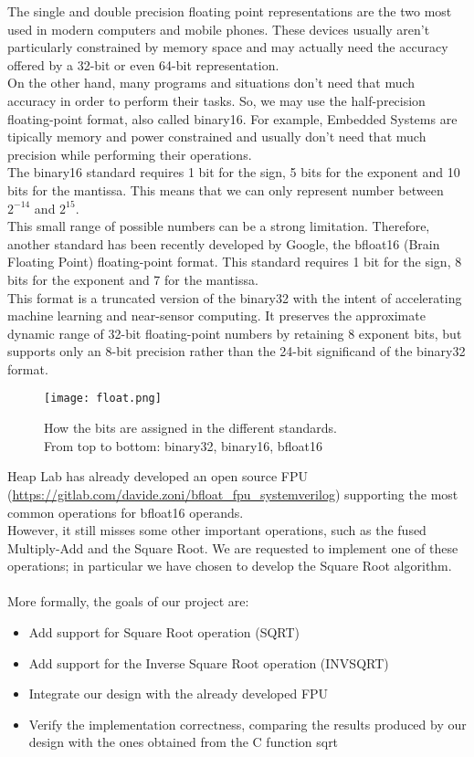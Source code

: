 The single and double precision floating point representations are the two most used in modern computers and mobile phones. These devices usually aren’t particularly constrained by memory space and may actually need the accuracy offered by a 32-bit or even 64-bit representation.\\
On the other hand, many programs and situations don’t need that much accuracy in order to perform their tasks. So, we may use the half-precision floating-point format, also called binary16. For example, Embedded Systems are tipically memory and power constrained and usually don't need that much precision while performing their operations. \\
The binary16 standard requires 1 bit for the sign, 5 bits for the exponent and 10 bits for the mantissa. This means that we can only represent number between $2^{-14}$ and $2^{15}$.\\
This small range of possible numbers can be a strong limitation. Therefore, another standard has been recently developed by Google, the bfloat16 (Brain Floating Point) floating-point format. This standard requires 1 bit for the sign, 8 bits for the exponent and 7 for the mantissa. \\
This format is a truncated version of the binary32 with the intent of accelerating machine learning and near-sensor computing. It preserves the approximate dynamic range of 32-bit floating-point numbers by retaining 8 exponent bits, but supports only an 8-bit precision rather than the 24-bit significand of the binary32 format. 

\begin{figure}[h]
	\centering
	\captionsetup{justification=centering}
	\texttt{[image: float.png]}	
	\caption{How the bits are assigned in the different standards. \\From top to bottom: binary32, binary16, bfloat16}
\end{figure}

Heap Lab has already developed an open source FPU (\url{https://gitlab.com/davide.zoni/bfloat_fpu_systemverilog}) supporting the most common operations for bfloat16 operands. \\
However, it still misses some other important operations, such as the fused Multiply-Add and the Square Root. We are requested to implement one of these operations; in particular we have chosen to develop the Square Root algorithm.\\
\\
More formally, the goals of our project are:
\begin{itemize}
	\item Add support for Square Root operation (SQRT)
	\item Add support for the Inverse Square Root operation (INVSQRT)
	\item Integrate our design with the already developed FPU
	\item Verify the implementation correctness, comparing the results produced by our design with the ones obtained from the C function sqrt
\end{itemize}

